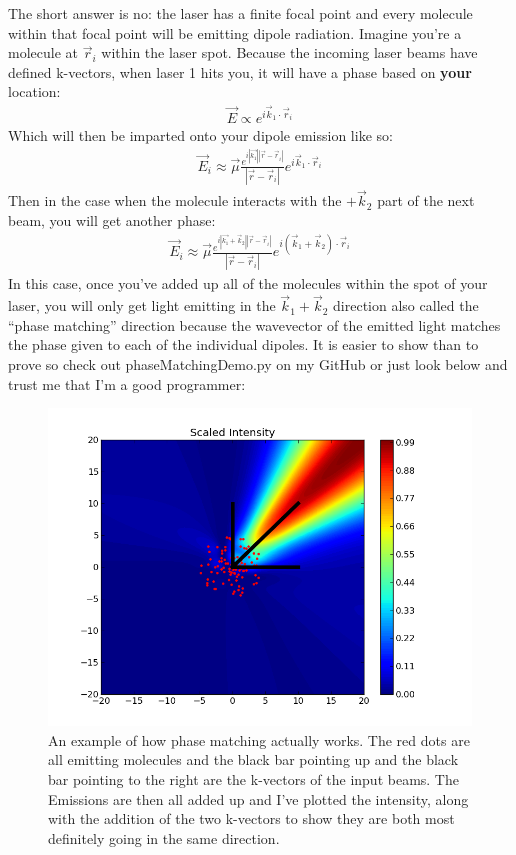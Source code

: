 The short answer is no: the laser has a finite focal point and every molecule within that focal point will be emitting dipole radiation.  Imagine you're a molecule at $\vec{r}_i$ within the laser spot.  Because the incoming laser beams have defined k-vectors, when laser 1 hits you, it will have a phase based on \textbf{your} location:
\begin{align}
	\vec{E} \propto e^{i\vec{k}_1 \cdot \vec{r}_i}
\end{align}
Which will then be imparted onto your dipole emission like so:
\begin{align}
	\vec{E}_i \approx \vec{\mu} \frac{e^{i |\vec{k_1}| |\vec{r} - \vec{r}_i|}}{|\vec{r} - \vec{r}_i|}  e^{i \vec{k}_1 \cdot \vec{r}_i}
\end{align}
Then in the case when the molecule interacts with the $+\vec{k}_2$ part of the next beam, you will get another phase:
\begin{align}
	\vec{E}_i \approx \vec{\mu} \frac{e^{i |\vec{k_1 }+ \vec{k}_2| |\vec{r} - \vec{r}_i|}}{|\vec{r} - \vec{r}_i|}  e^{ i (\vec{k}_1 + \vec{k}_2) \cdot \vec{r}_i}
\end{align}
In this case, once you've added up all of the molecules within the spot of your laser, you will only get light emitting in the $\vec{k}_1 +\vec{k}_2$ direction also called the ``phase matching'' direction because the wavevector of the emitted light matches the phase given to each of the individual dipoles.  It is easier to show than to prove so check out phaseMatchingDemo.py on my GitHub or just look below and trust me that I'm a good programmer:
\begin{figure}[h!]
   \includegraphics[width=1.0\textwidth]{phaseMatchStill.png}
   \caption{An example of how phase matching actually works.  The red dots are all emitting molecules and the black bar pointing up and the black bar pointing to the right are the k-vectors of the input beams.  The Emissions are then all added up and I've plotted the intensity, along with the addition of the two k-vectors to show they are both most definitely going in the same direction. }
	\label{fig:phaseMatached}
\end{figure}

